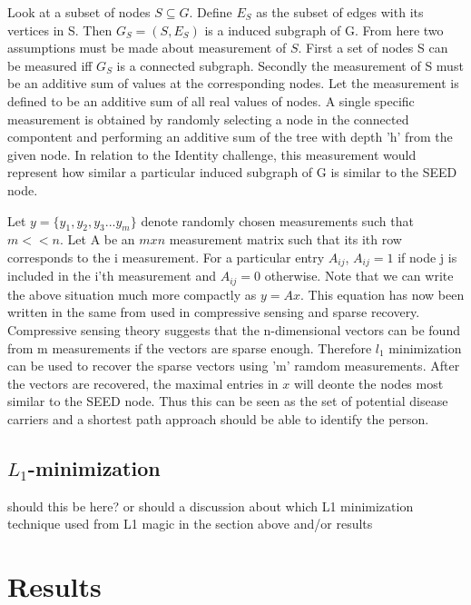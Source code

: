 \documentclass{article} %
\begin{document}
Look at a subset of nodes  $S \subseteq G$. Define $E_S$ as the subset of edges with its vertices in S. Then $G_S = (S,E_S)$ is a induced subgraph of G. From here two assumptions must be made about measurement of $S$. First a set of nodes S can be measured iff $G_S$ is a connected subgraph. Secondly the measurement of S must be an additive sum of values at the corresponding nodes. Let the measurement is defined to be an additive sum of all real values of nodes. A single specific measurement is obtained by randomly selecting a node in the connected compontent and performing an additive sum of the tree with depth 'h' from the given node. In relation to the Identity challenge, this measurement would represent how similar a particular induced subgraph of G is similar to the SEED node.

Let $y = \{ y_1, y_2, y_3 ... y_m \}$ denote randomly chosen measurements such that $m << n$.  Let A be an $m x n$ measurement matrix such that its ith row corresponds to the i measurement.  For a particular entry $A_{ij}$, $A_{ij} = 1$ if  node j is included in the i'th measurement and $A_{ij} = 0$ otherwise.
Note that we can write the above situation much more compactly as $y = Ax$. This equation has now been written in the same from used in compressive sensing and sparse recovery.  Compressive sensing theory suggests that the n-dimensional vectors can be found from m measurements if the vectors are sparse enough. Therefore $l_1$ minimization can be used to recover the sparse vectors using 'm' ramdom measurements.  After the vectors are recovered, the maximal entries in $x$  will deonte the nodes most similar to the SEED node. Thus this can be seen as the set of potential disease carriers and a shortest path approach should be able to identify the person.
\subsection{$L_1$-minimization}
should this be here? or should a discussion about which L1 minimization technique used from L1 magic in the section above and/or results



\section{Results}
\end{document}
